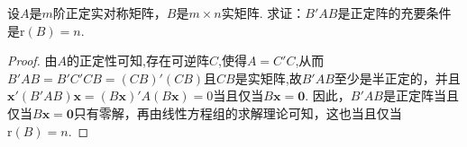 \documentclass[../../main.tex]{subfiles}%
\begin{document}
\begin{proposition}\label{proposition:第8章解答题6}
设\(A\)是\(m\)阶正定实对称矩阵，\(B\)是\(m\times n\)实矩阵. 求证：\(B'AB\)是正定阵的充要条件是\(\mathrm{r}(B)=n\).
\end{proposition}
\begin{proof}

由\(A\)的正定性可知,存在可逆阵$C$,使得$A=C'C$,从而\(B'AB=B'C'CB=(CB)'(CB)\)且$CB$是实矩阵,故$B'AB$至少是半正定的，并且\(\boldsymbol{x}'(B'AB)\boldsymbol{x}=(B\boldsymbol{x})'A(B\boldsymbol{x}) = 0\)当且仅当\(B\boldsymbol{x}=\boldsymbol{0}\). 因此，\(B'AB\)是正定阵当且仅当\(B\boldsymbol{x}=\boldsymbol{0}\)只有零解，再由线性方程组的求解理论可知，这也当且仅当\(\mathrm{r}(B)=n\). 

\end{proof}
\end{document}
